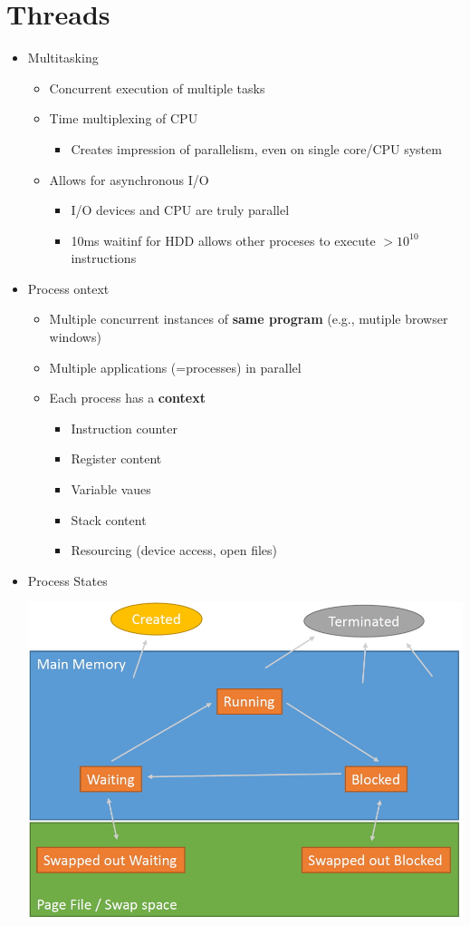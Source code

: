 \documentclass[a4paper]{article}
\begin{document}
\section{Threads}
	\begin{itemize}
		\item Multitasking
			\begin{itemize}
				\item Concurrent execution of multiple tasks
				\item Time multiplexing of CPU
					\begin{itemize}
						\item Creates impression of parallelism, even on single core/CPU system
					\end{itemize}
				\item Allows for asynchronous I/O
					\begin{itemize}
						\item I/O devices and CPU are truly parallel
						\item 10ms waitinf for HDD allows other proceses to execute $>10^{10}$ instructions
					\end{itemize}
			\end{itemize}
		\item Process ontext
			\begin{itemize}
				\item Multiple concurrent instances of \textbf{same program} (e.g., mutiple browser windows)
				\item Multiple applications (=processes) in parallel
				\item Each process has a \textbf{context}
					\begin{itemize}
						\item Instruction counter
						\item Register content
						\item Variable vaues
						\item Stack content
						\item Resourcing (device access, open files)
					\end{itemize}
			\end{itemize}
		\item Process States\\
		\begin{center}
		\includegraphics[scale=1]{Figures/ProcessState2.jpg}

\end{center}
\end{itemize}
\end{document}
